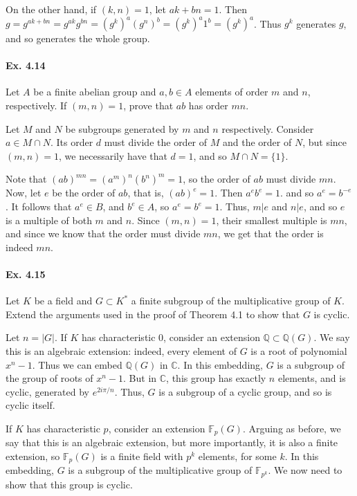 \documentclass[notitlepage]{article}
\theoremstyle{definition}
\newcommand\C{\mathbb{C}}
\newcommand\Q{\mathbb{Q}}
\begin{document}
On the other hand, if $(k, n) = 1$, let $ak + bn = 1$. Then $g =
g^{ak+bn} = g^{ak}g^{bn} = (g^k)^a (g^n)^b = (g^k)^a 1^b =
(g^k)^a$. Thus $g^k$ generates $g$, and so generates the whole group.


\paragraph{Ex. 4.14}
Let $A$ be a finite abelian group and $a, b \in A$ elements of order
$m$ and $n$, respectively.  If $(m, n) = 1$, prove that $ab$ has order
$mn$.

Let $M$ and $N$ be subgroups generated by $m$ and $n$
respectively. Consider $a \in M \cap N$. Its order $d$ must divide the
order of $M$ and the order of $N$, but since $(m, n) = 1$, we
necessarily have that $d = 1$, and so $M \cap N = \{1\}$.

Note that $(ab)^{mn} = (a^m)^n (b^n)^m = 1$, so the order of $ab$ must
divide $mn$. Now, let $e$ be the order of $ab$, that is, $(ab)^e =
1$. Then $a^e b^e = 1$. and so $a^e = b^{-e}$. It follows that $a^e
\in B$, and $b^e \in A$, so $a^e = b^e = 1$. Thus, $m|e$ and $n|e$,
and so $e$ is a multiple of both $m$ and $n$. Since $(m, n) = 1$,
their smallest multiple is $mn$, and since we know that the order must
divide $mn$, we get that the order is indeed $mn$.

\paragraph{Ex. 4.15}
Let $K$ be a field and $G \subset K^*$ a finite subgroup of the
multiplicative group of $K$.  Extend the arguments used in the proof
of Theorem 4.1 to show that $G$ is cyclic.

Let $n = |G|$. If $K$ has characteristic $0$, consider an extension
$\Q \subset \Q(G)$. We say this is an algebraic extension: indeed,
every element of $G$ is a root of polynomial $x^{n} - 1$. Thus we can
embed $\Q(G)$ in $\C$. In this embedding, $G$ is a subgroup of the
group of roots of $x^{n} - 1$. But in $\C$, this group has exactly $n$
elements, and is cyclic, generated by $e^{2i \pi / n}$. Thus, $G$ is a
subgroup of a cyclic group, and so is cyclic itself.

If $K$ has characteristic $p$, consider an extension
$\mathbb{F}_p(G)$. Arguing as before, we say that this is an algebraic
extension, but more importantly, it is also a finite extension, so
$\mathbb{F}_p(G)$ is a finite field with $p^k$ elements, for some
$k$. In this embedding, $G$ is a subgroup of the multiplicative group
of $\mathbb{F}_{p^k}$. We now need to show that this group is
cyclic.
\end{document}
